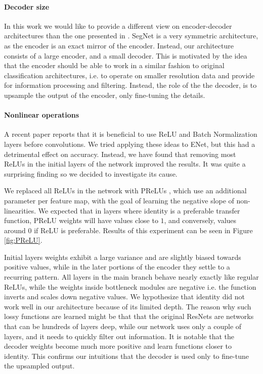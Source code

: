 \documentclass{article}
\begin{document}
\paragraph{Decoder size}
In this work we would like to provide a different view on encoder-decoder architectures than the one presented in \cite{badrinarayanan15}.
SegNet is a very symmetric architecture, as the encoder is an exact mirror of the encoder.
Instead, our architecture consists of a large encoder, and a small decoder.
This is motivated by the idea that the encoder should be able to work in a similar fashion to original classification architectures, i.e. to operate on smaller resolution data and provide for information processing and filtering.
Instead, the role of the the decoder, is to upsample the output of the encoder, only fine-tuning the details.

\paragraph{Nonlinear operations}
A recent paper \cite{he2016identity} reports that it is beneficial to use ReLU and Batch Normalization layers before convolutions.
We tried applying these ideas to ENet, but this had a detrimental effect on accuracy.
Instead, we have found that removing most ReLUs in the initial layers of the network improved the results.
It was quite a surprising finding so we decided to investigate its cause.

We replaced all ReLUs in the network with PReLUs \cite{he2015}, which use an additional parameter per feature map, with the goal of learning the negative slope of non-linearities.
We expected that in layers where identity is a preferable transfer function, PReLU weights will have values close to $1$, and conversely, values around $0$ if ReLU is preferable.
Results of this experiment can be seen in Figure \ref{fig:PReLU}.

Initial layers weights exhibit a large variance and are slightly biased towards positive values, while in the later portions of the encoder they settle to a recurring pattern.
All layers in the main branch behave nearly exactly like regular ReLUs, while the weights inside bottleneck modules are negative i.e. the function inverts and scales down negative values.
We hypothesize that identity did not work well in our architecture because of its limited depth.
The reason why such lossy functions are learned might be that that the original ResNets \cite{he2016identity} are networks that can be hundreds of layers deep, while our network uses only a couple of layers, and it needs to quickly filter out information.
It is notable that the decoder weights become much more positive and learn functions closer to identity.
This confirms our intuitions that the decoder is used only to fine-tune the upsampled output.
\end{document}
